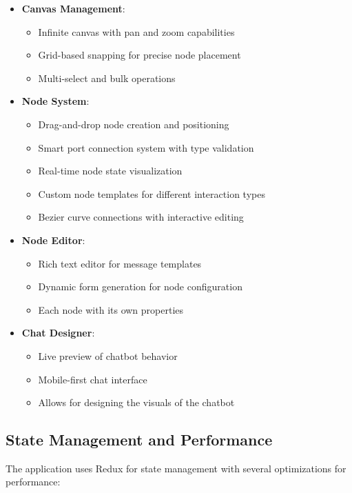 \begin{itemize}
    \item \textbf{Canvas Management}:
    \begin{itemize}
        \item Infinite canvas with pan and zoom capabilities
        \item Grid-based snapping for precise node placement
        \item Multi-select and bulk operations
    \end{itemize}
    
    \item \textbf{Node System}:
    \begin{itemize}
        \item Drag-and-drop node creation and positioning
        \item Smart port connection system with type validation
        \item Real-time node state visualization
        \item Custom node templates for different interaction types
        \item Bezier curve connections with interactive editing
    \end{itemize}

    \item \textbf{Node Editor}:
    \begin{itemize}
        \item Rich text editor for message templates
        \item Dynamic form generation for node configuration
        \item Each node with its own properties
    \end{itemize}
    
    \item \textbf{Chat Designer}:
    \begin{itemize}
        \item Live preview of chatbot behavior
        \item Mobile-first chat interface
        \item Allows for designing the visuals of the chatbot
    \end{itemize}
\end{itemize}

\subsection{State Management and Performance}
The application uses Redux for state management with several optimizations for performance:

